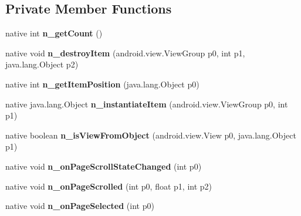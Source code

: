 \subsection*{Private Member Functions}
\begin{DoxyCompactItemize}
\item 
\mbox{\label{classmd5b60ffeb829f638581ab2bb9b1a7f4f3f_1_1CarouselPageAdapter_ac88e3ef26c87beaabd0db5798f9b74ef}} 
native int {\bfseries n\+\_\+get\+Count} ()
\item 
\mbox{\label{classmd5b60ffeb829f638581ab2bb9b1a7f4f3f_1_1CarouselPageAdapter_a777f131e0a7296c7c5b945facf6c3f4e}} 
native void {\bfseries n\+\_\+destroy\+Item} (android.\+view.\+View\+Group p0, int p1, java.\+lang.\+Object p2)
\item 
\mbox{\label{classmd5b60ffeb829f638581ab2bb9b1a7f4f3f_1_1CarouselPageAdapter_a75d9241e07e6bf015c0511c0906a7328}} 
native int {\bfseries n\+\_\+get\+Item\+Position} (java.\+lang.\+Object p0)
\item 
\mbox{\label{classmd5b60ffeb829f638581ab2bb9b1a7f4f3f_1_1CarouselPageAdapter_accd3c513ad78492649a0f8621015a5a0}} 
native java.\+lang.\+Object {\bfseries n\+\_\+instantiate\+Item} (android.\+view.\+View\+Group p0, int p1)
\item 
\mbox{\label{classmd5b60ffeb829f638581ab2bb9b1a7f4f3f_1_1CarouselPageAdapter_a7750bcfc405f4a308f76c5546d8d0e40}} 
native boolean {\bfseries n\+\_\+is\+View\+From\+Object} (android.\+view.\+View p0, java.\+lang.\+Object p1)
\item 
\mbox{\label{classmd5b60ffeb829f638581ab2bb9b1a7f4f3f_1_1CarouselPageAdapter_a721d65362e35523ffb3bfeb92508d0df}} 
native void {\bfseries n\+\_\+on\+Page\+Scroll\+State\+Changed} (int p0)
\item 
\mbox{\label{classmd5b60ffeb829f638581ab2bb9b1a7f4f3f_1_1CarouselPageAdapter_a08a0bf1136d5dff399b8fd27b55b31d3}} 
native void {\bfseries n\+\_\+on\+Page\+Scrolled} (int p0, float p1, int p2)
\item 
\mbox{\label{classmd5b60ffeb829f638581ab2bb9b1a7f4f3f_1_1CarouselPageAdapter_a731cc671e0f6930df1ae12d2bc0c00f9}} 
native void {\bfseries n\+\_\+on\+Page\+Selected} (int p0)
\end{DoxyCompactItemize}
